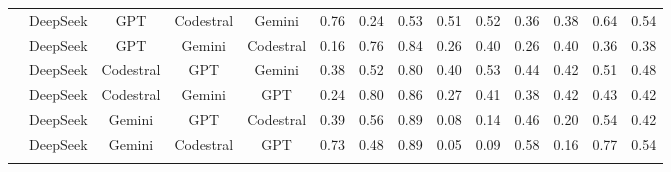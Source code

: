 \documentclass[authoryear,final,5p,times,twocolumn]{elsarticle}
\theoremstyle{plain}
\begin{document}
\begin{table}[p]
{\begin{tabular}{
>{\centering\arraybackslash}l
*{13}{>{\centering\arraybackslash}c}
}
& DeepSeek & GPT & Codestral & Gemini & \cellcolor{green!17}0.76 & \cellcolor{red!15}0.24 & \cellcolor{red!20}0.53 & \cellcolor{green!19}0.51 & \cellcolor{green!18}0.52 & \cellcolor{orange!15}0.36 & \cellcolor{orange!12}0.38 & \cellcolor{green!11}0.64 & \cellcolor{green!13}0.54 \\
& DeepSeek & GPT & Gemini & Codestral & \cellcolor{red!17}0.16 & \cellcolor{green!11}0.76 & \cellcolor{green!14}0.84 & \cellcolor{orange!16}0.26 & \cellcolor{green!10}0.40 & \cellcolor{red!12}0.26 & \cellcolor{orange!11}0.40 & \cellcolor{red!14}0.36 & \cellcolor{red!12}0.38 \\
& DeepSeek & Codestral & GPT & Gemini & \cellcolor{orange!17}0.38 & \cellcolor{orange!16}0.52 & \cellcolor{green!11}0.80 & \cellcolor{green!12}0.40 & \cellcolor{green!18}0.53 & \cellcolor{green!10}0.44 & \cellcolor{orange!10}0.42 & \cellcolor{orange!15}0.51 & \cellcolor{orange!12}0.48 \\
& DeepSeek & Codestral & Gemini & GPT & \cellcolor{red!13}0.24 & \cellcolor{green!13}0.80 & \cellcolor{green!16}0.86 & \cellcolor{orange!15}0.27 & \cellcolor{green!11}0.41 & \cellcolor{orange!14}0.38 & \cellcolor{orange!10}0.42 & \cellcolor{red!10}0.43 & \cellcolor{orange!18}0.42 \\
& DeepSeek & Gemini & GPT & Codestral & \cellcolor{orange!17}0.39 & \cellcolor{orange!14}0.56 & \cellcolor{green!18}0.89 & \cellcolor{red!18}0.08 & \cellcolor{red!16}0.14 & \cellcolor{green!11}0.46 & \cellcolor{red!14}0.20 & \cellcolor{orange!14}0.54 & \cellcolor{orange!18}0.42 \\
& DeepSeek & Gemini & Codestral & GPT & \cellcolor{green!16}0.73 & \cellcolor{orange!17}0.48 & \cellcolor{green!18}0.89 & \cellcolor{red!20}0.05 & \cellcolor{red!20}0.09 & \cellcolor{green!19}0.58 & \cellcolor{red!17}0.16 & \cellcolor{green!18}0.77 & \cellcolor{green!13}0.54 \\
\addlinespace[1.5ex]


\end{tabular}}
\end{table}
\end{document}
